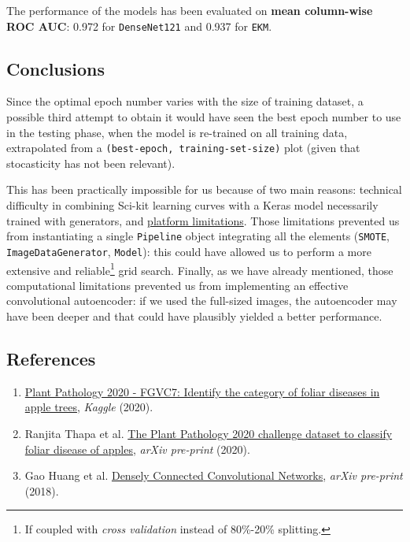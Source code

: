 \documentclass[10pt,]{article}
\providecommand{\tightlist}{%
  \setlength{\itemsep}{0pt}\setlength{\parskip}{0pt}}
\begin{document}
The performance of the models has been evaluated on \textbf{mean
column-wise ROC AUC}: 0.972 for \texttt{DenseNet121} and 0.937 for
\texttt{EKM}.

\hypertarget{conclusions}{%
\subsection{\texorpdfstring{\textbf{Conclusions}}{Conclusions}}\label{conclusions}}

Since the optimal epoch number varies with the size of training dataset,
a possible third attempt to obtain it would have seen the best epoch
number to use in the testing phase, when the model is re-trained on all
training data, extrapolated from a
\texttt{(best-epoch,\ training-set-size)} plot (given that stocasticity
has not been relevant).

This has been practically impossible for us because of two main reasons:
technical difficulty in combining Sci-kit learning curves with a Keras
model necessarily trained with generators, and
\protect\hyperlink{limitations}{platform limitations}. Those limitations
prevented us from instantiating a single \texttt{Pipeline} object
integrating all the elements (\texttt{SMOTE},
\texttt{ImageDataGenerator}, \texttt{Model}): this could have allowed us
to perform a more extensive and reliable\footnote{If coupled with
  \emph{cross validation} instead of 80\%-20\% splitting.} grid search.
Finally, as we have already mentioned, those computational limitations
prevented us from implementing an effective convolutional autoencoder:
if we used the full-sized images, the autoencoder may have been deeper
and that could have plausibly yielded a better performance.

\hypertarget{references}{%
\subsection{\texorpdfstring{\textbf{References}}{References}}\label{references}}

\begin{enumerate}
\def\labelenumi{\arabic{enumi}.}
\tightlist
\item
  \href{https://www.kaggle.com/c/plant-pathology-2020-fgvc7}{Plant
  Pathology 2020 - FGVC7: Identify the category of foliar diseases in
  apple trees}, \emph{Kaggle} (2020).
\item
  Ranjita Thapa et al. \href{https://arxiv.org/abs/2004.11958}{The Plant
  Pathology 2020 challenge dataset to classify foliar disease of
  apples}, \emph{arXiv pre-print} (2020).
\item
  Gao Huang et al. \href{https://arxiv.org/abs/1608.06993}{Densely
  Connected Convolutional Networks}, \emph{arXiv pre-print} (2018).
\end{enumerate}
\end{document}
